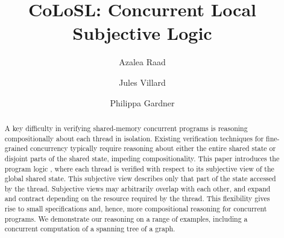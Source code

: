 \documentclass[runningheads,a4paper]{llncs}
\begin{document}
%
\title{CoLoSL: Concurrent Local Subjective Logic}
\author{Azalea Raad\and Jules Villard\and Philippa Gardner}

\maketitle

\begin{abstract}
A key difficulty in verifying shared-memory concurrent programs is
reasoning compositionally about each thread in isolation. Existing
verification techniques for fine-grained concurrency typically require
reasoning about either the entire shared state  or disjoint
parts of the shared state,  impeding compositionality.  This paper introduces
the program logic \colosl, where each thread is verified with respect
to its subjective view of the global shared state.  This subjective
view describes only that part of the state  accessed
by the thread. Subjective views may arbitrarily overlap with each
other, and expand and contract depending on the resource required by
the thread.  This flexibility gives rise to small specifications and,
hence,  more compositional reasoning for concurrent programs. We
demonstrate our reasoning on 
a range of examples,  including a concurrent
computation of a spanning tree of a graph.
\end{abstract}








%
\end{document}
